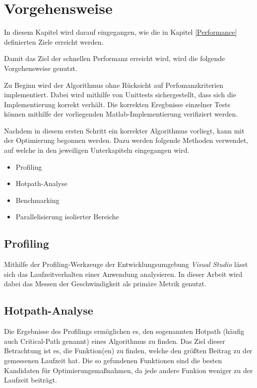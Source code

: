 \chapter{Vorgehensweise}\label{plan}

In diesem Kapitel wird darauf eingegangen, wie die in Kapitel \ref{Performance} definierten Ziele erreicht werden.

Damit das Ziel der schnellen Performanz erreicht wird, wird die folgende Vorgehensweise genutzt.

Zu Beginn wird der Algorithmus ohne Rücksicht auf Perfomanzkriterien implementiert.
Dabei wird mithilfe von Unittests sichergestellt, dass sich die Implementierung korrekt verhält. 
Die korrekten Eregbnisse einzelner Tests können mithilfe der vorliegenden Matlab-Implementierung verifiziert werden.

Nachdem in diesem ersten Schritt ein korrekter Algorithmus vorliegt, kann mit der Optimierung begonnen werden.
Dazu werden folgende Methoden verwendet, auf welche in den jeweiligen Unterkapiteln eingegangen wird.

\begin{itemize}
    \item Profiling
    \item Hotpath-Analyse
    \item Benchmarking
    \item Parallelisierung isolierter Bereiche
\end{itemize}

\section{Profiling}

Mithilfe der Profiling-Werkzeuge der Entwicklungsumgebung \textit{Visual Studio} lässt sich das Laufzeitverhalten einer Anwendung analysieren.
In dieser Arbeit wird dabei das Messen der Geschwindigkeit als primäre Metrik genutzt. 


\section{Hotpath-Analyse}

Die Ergebnisse des Profilings ermöglichen es, den sogenannten Hotpath (häufig auch Critical-Path genannt) eines Algorithmus zu finden.
Das Ziel dieser Betrachtung ist es, die Funktion(en) zu finden, welche den größten Beitrag zu der gemessenen Laufzeit hat. 
Die so gefundenen Funktionen sind die besten Kandidaten für Optimierungsmaßnahmen, da jede andere Funkion weniger zu der Laufzeit beiträgt.


